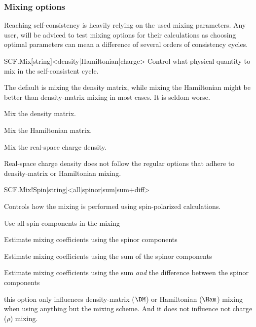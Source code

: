 \subsubsection{Mixing options}

Reaching self-consistency is heavily relying on the used mixing
parameters.
Any user, will be adviced to test mixing options for their
calculations as choosing optimal parameters can mean a difference of
several orders of consistency cycles. 


\begin{fdfentry}{SCF.Mix}[string]<density|Hamiltonian|charge>
  Control what physical quantity to mix in the self-consistent cycle.

  The default is mixing the density matrix, while mixing the
  Hamiltonian might be better than density-matrix mixing in most
  cases. It is seldom worse.

  \begin{fdfoptions}
    \option[density]%
    Mix the density matrix.

    \option[Hamiltonian]%
    Mix the Hamiltonian matrix.

    \option[charge]%
    Mix the real-space charge density.
    
  \end{fdfoptions}
  
  \note Real-space charge density does not follow the regular options
  that adhere to density-matrix or Hamiltonian mixing.

\end{fdfentry}

\begin{fdfentry}{SCF.Mix!Spin}[string]<all|spinor|sum|sum+diff>

  Controls how the mixing is performed using spin-polarized
  calculations. 
  
  \begin{fdfoptions}
    \option[all] %
    Use all spin-components in the mixing

    \option[spinor] %
    Estimate mixing coefficients using the spinor components

    \option[sum] %
    Estimate mixing coefficients using the sum of the spinor
    components 

    Estimate mixing coefficients using the sum \emph{and} the
    difference between the spinor components 
  \end{fdfoptions}

  \note this option only influences density-matrix ($\DM$) or
  Hamiltonian ($\Ham$) mixing when using anything but the
   mixing scheme. And it does not influence not charge
  ($\rho$) mixing.
  
\end{fdfentry}

